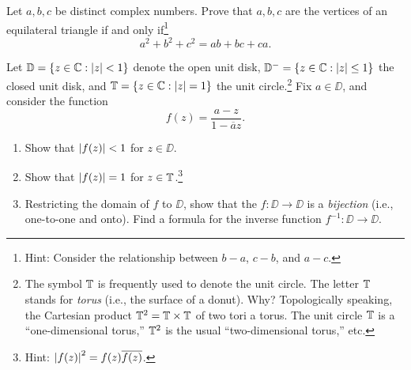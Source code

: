 \documentclass{../math135}
\begin{document}
\begin{exercise}
	Let \(a,b,c\) be distinct complex numbers.  Prove that \(a,b,c\) are
  the vertices of an equilateral triangle if and only
  if\footnote{Hint: Consider the relationship between \(b-a\),
    \(c-b\), and \(a-c\).}
	\begin{equation}
		a^2 + b^2 + c^2 = ab+bc+ca.
	\end{equation}

  \begin{solution}
  \end{solution}

\end{exercise}

\begin{exercise}
	Let \(\DD = \{z\in \CC : \abs z < 1\}\) denote the open unit disk,
  \(\DD^- = \{z \in \CC: \abs z \le 1\}\) the closed unit disk, and
  \(\TT = \{z \in \CC : \abs z = 1\}\) the unit circle.\footnote{The
    symbol \(\TT\) is frequently used to denote the unit circle.  The
    letter \(\TT\) stands for \emph{torus} (i.e., the surface of a
    donut).  Why?  Topologically speaking, the Cartesian product
    \(\TT^2 = \TT \times \TT\) of two tori a torus.  The unit circle
    \(\TT\) is a ``one-dimensional torus,'' \(\TT^2\) is the usual
    ``two-dimensional torus,'' etc.}  Fix \(a \in \DD\), and consider
  the function
	\begin{equation}\label{eq-Blaschke}
		f(z) = \frac{a-z}{1 - \overline{a} z}.
	\end{equation}
	\begin{enumerate}
	\item Show that \(\abs*{f(z)} <1\) for \(z \in \DD\).

    \begin{solution}
    \end{solution}

	\item Show that \(\abs*{f(z)} = 1\) for \(z \in \TT\).\footnote{Hint:
      \(\abs*{f(z)}^2 = f(z) \overline{f(z)}\).}

    \begin{solution}
    \end{solution}

	\item Restricting the domain of \(f\) to \(\DD\), show that the
    \(f \colon \DD\to\DD\) is a \emph{bijection} (i.e., one-to-one and onto).
    Find a formula for the inverse function
    \(f^{-1} \colon \DD\to\DD\).

    \begin{solution}
    \end{solution}

	\end{enumerate}
\end{exercise}
\end{document}
